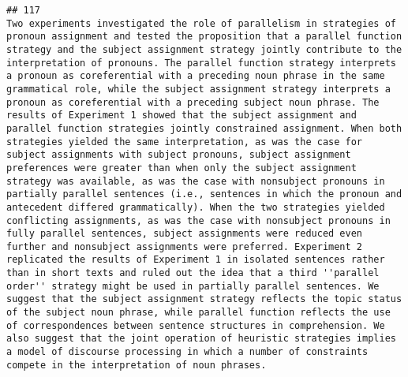 \documentclass[
  english,
  man]{apa6}
\begin{document}
\begin{verbatim}
## 117                                                                                                                                                                                                                                                                                                                                                                                                                                                                                                                                                                                                                                                                                                                                                                                             Two experiments investigated the role of parallelism in strategies of pronoun assignment and tested the proposition that a parallel function strategy and the subject assignment strategy jointly contribute to the interpretation of pronouns. The parallel function strategy interprets a pronoun as coreferential with a preceding noun phrase in the same grammatical role, while the subject assignment strategy interprets a pronoun as coreferential with a preceding subject noun phrase. The results of Experiment 1 showed that the subject assignment and parallel function strategies jointly constrained assignment. When both strategies yielded the same interpretation, as was the case for subject assignments with subject pronouns, subject assignment preferences were greater than when only the subject assignment strategy was available, as was the case with nonsubject pronouns in partially parallel sentences (i.e., sentences in which the pronoun and antecedent differed grammatically). When the two strategies yielded conflicting assignments, as was the case with nonsubject pronouns in fully parallel sentences, subject assignments were reduced even further and nonsubject assignments were preferred. Experiment 2 replicated the results of Experiment 1 in isolated sentences rather than in short texts and ruled out the idea that a third ''parallel order'' strategy might be used in partially parallel sentences. We suggest that the subject assignment strategy reflects the topic status of the subject noun phrase, while parallel function reflects the use of correspondences between sentence structures in comprehension. We also suggest that the joint operation of heuristic strategies implies a model of discourse processing in which a number of constraints compete in the interpretation of noun phrases.

\end{verbatim}
\end{document}
